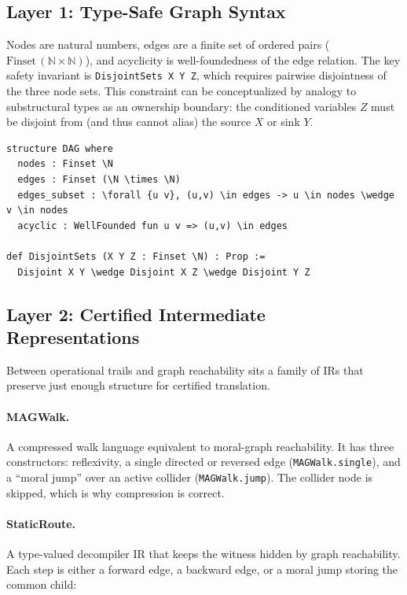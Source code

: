 \documentclass[acmsmall,screen,review,anonymous,nonacm]{acmart}
\newcommand{\lean}[1]{\lstinline!#1!}
\newcommand{\N}{\mathbb{N}}
\begin{document}
\subsection{Layer 1: Type-Safe Graph Syntax}

Nodes are natural numbers, edges are a finite set of ordered pairs
($\mathrm{Finset}\,(\N \times \N)$), and acyclicity is well-foundedness of the
edge relation.  The key safety invariant is
\lean{DisjointSets X Y Z}, which requires pairwise disjointness of the three
node sets.  This constraint can be conceptualized by analogy to substructural types
as an ownership boundary: the conditioned variables $Z$ must be disjoint from
(and thus cannot alias) the source $X$ or sink $Y$.

\begin{lstlisting}[caption={DAG structure and safety predicate}]
structure DAG where
  nodes : Finset \N
  edges : Finset (\N \times \N)
  edges_subset : \forall {u v}, (u,v) \in edges -> u \in nodes \wedge v \in nodes
  acyclic : WellFounded fun u v => (u,v) \in edges

def DisjointSets (X Y Z : Finset \N) : Prop :=
  Disjoint X Y \wedge Disjoint X Z \wedge Disjoint Y Z
\end{lstlisting}

\subsection{Layer 2: Certified Intermediate Representations}

Between operational trails and graph reachability sits a family of IRs that
preserve just enough structure for certified translation.

\paragraph{MAGWalk.} A compressed walk language equivalent to moral-graph
reachability.  It has three constructors: reflexivity, a single directed or
reversed edge (\lean{MAGWalk.single}), and a ``moral jump'' over an active
collider (\lean{MAGWalk.jump}).  The collider node is skipped, which is why
compression is correct.

\paragraph{StaticRoute.} A type-valued decompiler IR that keeps the witness
hidden by graph reachability.  Each step is either a forward edge, a backward
edge, or a moral jump storing the common child:
\end{document}
